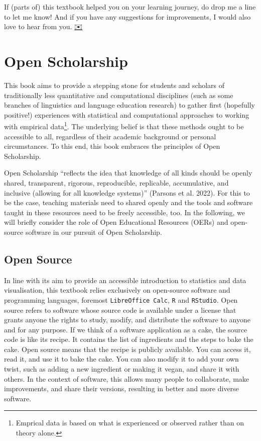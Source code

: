 \documentclass[
  letterpaper,
  DIV=11,
  numbers=noendperiod]{scrreprt}
\begin{document}
If (parts of) this textbook helped you on your learning journey, do drop
me a line to let me know! And if you have any suggestions for
improvements, I would also love to hear from you.
\href{mailto:elefoll@uni-koeln.de}{✉️}


\chapter{Open Scholarship}\label{open-scholarship}

This book aims to provide a stepping stone for students and scholars of
traditionally less quantitative and computational disciplines (such as
some branches of linguistics and language education research) to gather
first (hopefully positive!) experiences with statistical and
computational approaches to working with empirical data\footnote{Emprical
  data is based on what is experienced or observed rather than on theory
  alone.}. The underlying belief is that these methods ought to be
accessible to all, regardless of their academic background or personal
circumstances. To this end, this book embraces the principles of Open
Scholarship.

Open Scholarship ``reflects the idea that knowledge of all kinds should
be openly shared, transparent, rigorous, reproducible, replicable,
accumulative, and inclusive (allowing for all knowledge systems)''
(Parsons et al. 2022). For this to be the case, teaching materials need
to shared openly and the tools and software taught in these resources
need to be freely accessible, too. In the following, we will briefly
consider the role of Open Educational Resources (OERs) and open-source
software in our pursuit of Open Scholarship.

\section{Open Source}\label{open-source}

In line with its aim to provide an accessible introduction to statistics
and data visualisation, this textbook relies exclusively on open-source
software and programming languages, foremost \texttt{LibreOffice\ Calc},
\texttt{R} and \texttt{RStudio}. Open source refers to software whose
source code is available under a license that grants anyone the rights
to study, modify, and distribute the software to anyone and for any
purpose. If we think of a software application as a cake, the source
code is like its recipe. It contains the list of ingredients and the
steps to bake the cake. Open source means that the recipe is publicly
available. You can access it, read it, and use it to bake the cake. You
can also modify it to add your own twist, such as adding a new
ingredient or making it vegan, and share it with others. In the context
of software, this allows many people to collaborate, make improvements,
and share their versions, resulting in better and more diverse software.
\end{document}
